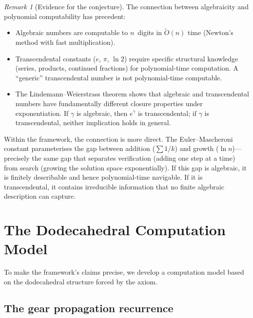 \documentclass[12pt, a4paper]{article}
\theoremstyle{plain}
\theoremstyle{definition}
\theoremstyle{remark}
\newtheorem{remark}[theorem]{Remark}
\begin{document}
\begin{remark}[Evidence for the conjecture]
The connection between algebraicity and polynomial computability has
precedent:
\begin{itemize}[nosep]
  \item Algebraic numbers are computable to $n$~digits in
        $\tilde{O}(n)$ time (Newton's method with
        fast multiplication).
  \item Transcendental constants ($e$, $\pi$, $\ln 2$) require
        specific structural knowledge (series, products, continued
        fractions) for polynomial-time computation.  A ``generic''
        transcendental number is not polynomial-time computable.
  \item The Lindemann--Weierstrass theorem shows that algebraic and
        transcendental numbers have fundamentally different closure
        properties under exponentiation.  If $\gamma$ is algebraic,
        then $e^\gamma$ is transcendental; if $\gamma$ is
        transcendental, neither implication holds in general.
\end{itemize}

Within the framework, the connection is more direct.  The
Euler--Mascheroni constant parameterises the gap between addition
($\sum 1/k$) and growth ($\ln n$)---precisely the same gap that
separates verification (adding one step at a time) from search
(growing the solution space exponentially).  If this gap is algebraic,
it is finitely describable and hence polynomial-time navigable.  If it
is transcendental, it contains irreducible information that no finite
algebraic description can capture.
\end{remark}

\section{The Dodecahedral Computation Model}
\label{sec:dodecahedral}

To make the framework's claims precise, we develop a computation model
based on the dodecahedral structure forced by the axiom.

\subsection{The gear propagation recurrence}
\end{document}
